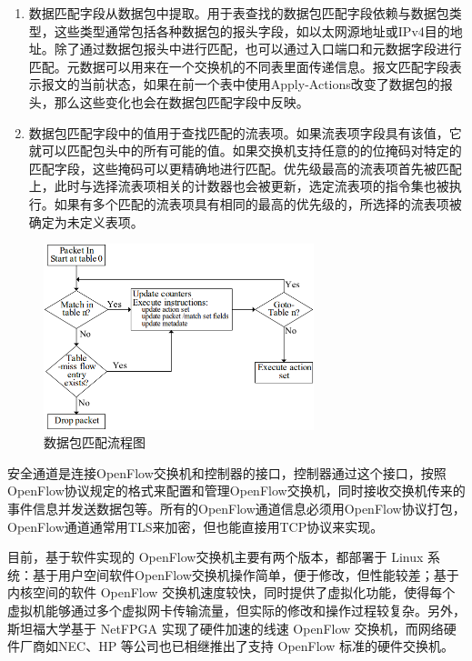 \begin{enumerate}
\item 数据匹配字段从数据包中提取。用于表查找的数据包匹配字段依赖与数据包类型，这些类型通常包括各种数据包的报头字段，如以太网源地址或IPv4目的地址。除了通过数据包报头中进行匹配，也可以通过入口端口和元数据字段进行匹配。元数据可以用来在一个交换机的不同表里面传递信息。报文匹配字段表示报文的当前状态，如果在前一个表中使用Apply-Actions改变了数据包的报头，那么这些变化也会在数据包匹配字段中反映。 
\item 数据包匹配字段中的值用于查找匹配的流表项。如果流表项字段具有该值，它就可以匹配包头中的所有可能的值。如果交换机支持任意的的位掩码对特定的匹配字段，这些掩码可以更精确地进行匹配。优先级最高的流表项首先被匹配上，此时与选择流表项相关的计数器也会被更新，选定流表项的指令集也被执行。如果有多个匹配的流表项具有相同的最高的优先级的，所选择的流表项被确定为未定义表项。
\end{enumerate}

\begin{figure}[!htb]
  \centering
  \includegraphics[width=0.7\textwidth]{logo/match.png}
  \caption{数据包匹配流程图}
  \label{fig:match}
\end{figure}

安全通道是连接OpenFlow交换机和控制器的接口，控制器通过这个接口，按照 OpenFlow协议规定的格式来配置和管理OpenFlow交换机，同时接收交换机传来的事件信息并发送数据包等。所有的OpenFlow通道信息必须用OpenFlow协议打包，OpenFlow通道通常用TLS来加密，但也能直接用TCP协议来实现。

目前，基于软件实现的 OpenFlow交换机主要有两个版本\cite{openflow-2}，都部署于 Linux 系统：基于用户空间软件OpenFlow交换机操作简单，便于修改，但性能较差；基于内核空间的软件 OpenFlow 交换机\cite{openflow-3}速度较快，同时提供了虚拟化功能，使得每个虚拟机能够通过多个虚拟网卡传输流量，但实际的修改和操作过程较复杂。另外，斯坦福大学基于 NetFPGA 实现了硬件加速的线速 OpenFlow 交换机\cite{openflow-4}，而网络硬件厂商如NEC、HP 等公司也已相继推出了支持 OpenFlow 标准的硬件交换机\cite{openflow-1}。

